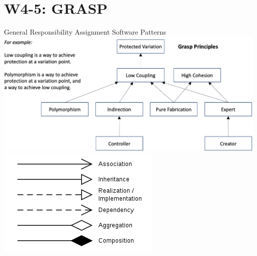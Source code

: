 \section{W4-5: GRASP}
General Responsibility Assignment Software Patterns
\includegraphics[width=\linewidth]{figs/relationship-of-grasp-principles.png}\\
\includegraphics[width=\linewidth]{figs/uml-notation.png}\\
